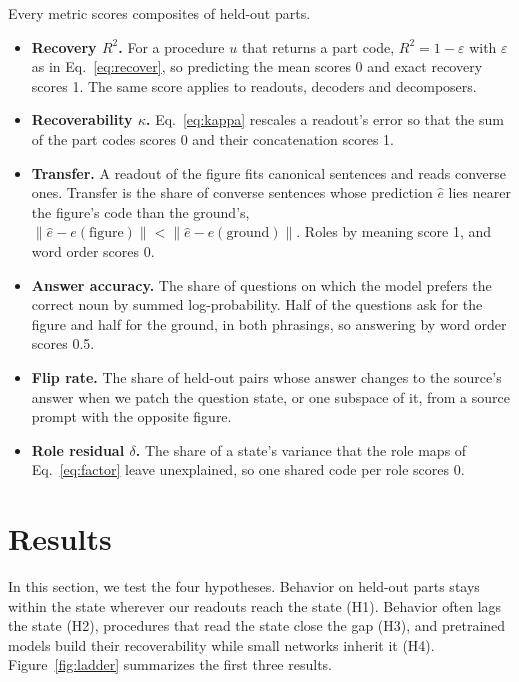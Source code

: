 \documentclass[10pt]{article}
\theoremstyle{plain}
\theoremstyle{remark}
\begin{document}
Every metric scores composites of held-out parts.
\begin{itemize}
  \item \textbf{Recovery $R^2$.} For a procedure $u$ that returns a part code, $R^2 = 1 - \varepsilon$ with $\varepsilon$ as in Eq.~\eqref{eq:recover}, so predicting the mean scores 0 and exact recovery scores 1. The same score applies to readouts, decoders and decomposers.
  \item \textbf{Recoverability $\kappa$.} Eq.~\eqref{eq:kappa} rescales a readout's error so that the sum of the part codes scores 0 and their concatenation scores 1.
  \item \textbf{Transfer.} A readout of the figure fits canonical sentences and reads converse ones. Transfer is the share of converse sentences whose prediction $\hat{e}$ lies nearer the figure's code than the ground's, $\lVert \hat{e} - e(\text{figure}) \rVert < \lVert \hat{e} - e(\text{ground}) \rVert$. Roles by meaning score 1, and word order scores 0.
  \item \textbf{Answer accuracy.} The share of questions on which the model prefers the correct noun by summed log-probability. Half of the questions ask for the figure and half for the ground, in both phrasings, so answering by word order scores 0.5.
  \item \textbf{Flip rate.} The share of held-out pairs whose answer changes to the source's answer when we patch the question state, or one subspace of it, from a source prompt with the opposite figure.
  \item \textbf{Role residual $\delta$.} The share of a state's variance that the role maps of Eq.~\eqref{eq:factor} leave unexplained, so one shared code per role scores 0.
\end{itemize}

\section{Results}
\label{sec:results}

In this section, we test the four hypotheses. Behavior on held-out parts stays within the state wherever our readouts reach the state (H1). Behavior often lags the state (H2), procedures that read the state close the gap (H3), and pretrained models build their recoverability while small networks inherit it (H4). Figure~\ref{fig:ladder} summarizes the first three results.
\end{document}
